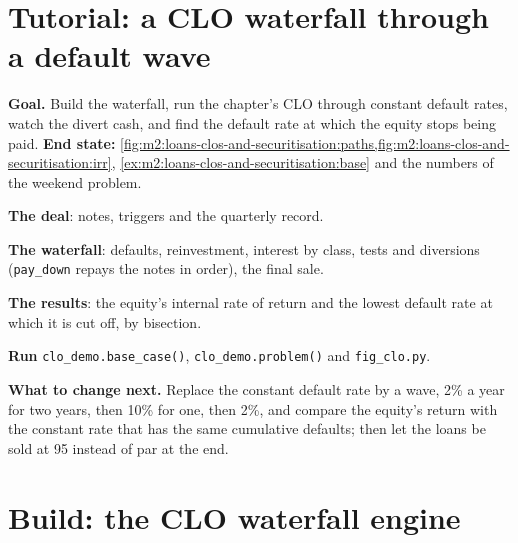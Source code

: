 \section{Tutorial: a CLO waterfall through a default wave}\label{tut:m2:loans-clos-and-securitisation:waterfall}

\begin{tutorial}
\textbf{Goal.} Build the waterfall, run the chapter's CLO through constant default
rates, watch the  divert cash, and find the default rate at
which the equity stops being paid.
\textbf{End state:} \cref{fig:m2:loans-clos-and-securitisation:paths,fig:m2:loans-clos-and-securitisation:irr},
\cref{ex:m2:loans-clos-and-securitisation:base} and the numbers of the weekend problem.
\begin{tutsteps}
\item \textbf{The deal}: notes, triggers and the quarterly record.
\label{lst:m2:loans-clos-and-securitisation:deal}
\item \textbf{The waterfall}: defaults, reinvestment, interest by class, tests and
diversions (\texttt{pay\_down} repays the notes in order), the final sale.
\label{lst:m2:loans-clos-and-securitisation:run}
\item \textbf{The results}: the equity's internal rate of return and the lowest default
rate at which it is cut off, by bisection.
\label{lst:m2:loans-clos-and-securitisation:irr}
\item \textbf{Run} \texttt{clo\_demo.base\_case()}, \texttt{clo\_demo.problem()} and
\texttt{fig\_clo.py}.
\end{tutsteps}
\textbf{What to change next.} Replace the constant default rate by a wave, 2\% a year
for two years, then 10\% for one, then 2\%, and compare the equity's return with the
constant rate that has the same cumulative defaults; then let the loans be sold at 95
instead of par at the end.
\end{tutorial}

\section{Build: the CLO waterfall engine}\label{bld:m2:loans-clos-and-securitisation:waterfall}

